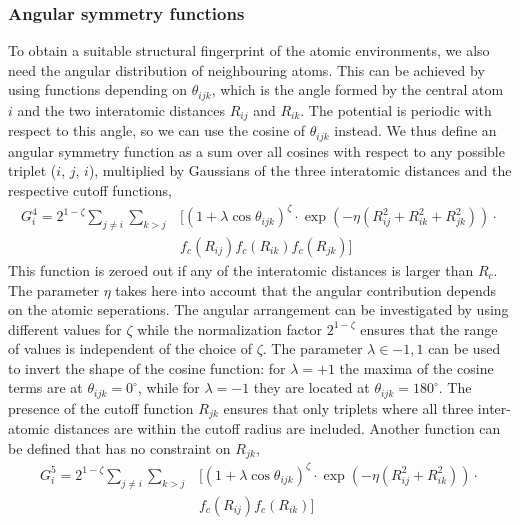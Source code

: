 \documentclass[twoside,english]{uiofysmaster}
\begin{document}
\subsubsection{Angular symmetry functions}
To obtain a suitable structural fingerprint of the atomic environments, we also need the angular distribution
of neighbouring atoms. This can be achieved by using functions depending on $\theta_{ijk}$, which
is the angle formed by the central atom $i$ and the two interatomic distances $R_{ij}$ and $R_{ik}$. 
The potential is periodic with respect to this angle, so we can use the cosine of $\theta_{ijk}$ instead. 
We thus define an angular symmetry function as a sum over all cosines with respect to any possible triplet
($i$, $j$, $i$), multiplied by Gaussians of the three interatomic distances and the respective cutoff functions,
\begin{equation}
\begin{aligned}
 G_i^4 = 2^{1-\zeta}\sum_{j\neq i}\sum_{k>j} &\bigr[(1 + \lambda \cos\theta_{ijk})^\zeta \cdot
 \exp(-\eta (R_{ij}^2 + R_{ik}^2 + R_{jk}^2)) \cdot \\
 &f_c(R_{ij}) f_c(R_{ik}) f_c (R_{jk})\bigr]
 \label{G4}
\end{aligned}
\end{equation}
This function is zeroed out if any of the interatomic distances is larger than $R_c$. The parameter $\eta$ takes here
into account that the angular contribution depends on the atomic seperations. The angular arrangement can be 
investigated by using different values for $\zeta$ while the normalization factor $2^{1-\zeta}$ ensures that the range of 
values is independent of the choice of $\zeta$. The parameter $\lambda \in {-1,1}$ can be used to invert the shape of the 
cosine function: for $\lambda = +1$ the maxima of the cosine terms are at $\theta_{ijk} = 0^\circ$, 
while for $\lambda=-1$ they are located at $\theta_{ijk} = 180^\circ$. The presence of the cutoff function $R_{jk}$
ensures that only triplets where all three inter-atomic distances are within the cutoff radius are included. 
Another function can be defined that has no constraint on $R_{jk}$,
\begin{equation}
\begin{aligned}
  G_i^5 = 2^{1-\zeta}\sum_{j\neq i}\sum_{k>j} &[(1 + \lambda \cos\theta_{ijk})^\zeta \cdot
 \exp(-\eta (R_{ij}^2 + R_{ik}^2)) \cdot \\
 &f_c(R_{ij}) f_c(R_{ik})]
 \label{G5}
\end{aligned}
\end{equation}
\end{document}
